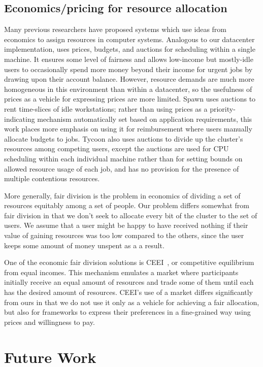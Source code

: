 \documentclass{acm_proc_article-sp}
\begin{document}
\subsection{Economics/pricing for resource allocation}
Many previous researchers have proposed systems which use ideas from economics
to assign resources in computer systems.  Analogous to our datacenter
implementation, \cite{stoica94} uses prices, budgets, and auctions for
scheduling within a single machine. It ensures some level of fairness and
allows low-income but mostly-idle users to occasionally spend more money beyond
their income for urgent jobs by drawing upon their account balance. However,
resource demands are much more homogeneous in this environment than within a
datacenter, so the usefulness of prices as a vehicle for expressing prices are
more limited. Spawn \cite{spawn} uses auctions to rent time-slices of idle
workstations; rather than using prices as a priority-indicating mechanism
automatically set based on application requirements, this work places more
emphasis on using it for reimbursement where users manually allocate budgets to
jobs. Tycoon \cite{tycoon} also uses auctions to divide up the cluster's
resources among competing users, except the auctions are used for CPU scheduling
within each individual machine rather than for setting bounds on allowed
resource usage of each job, and has no provision for the presence of
multiple contentious resources.

More generally, fair division is the problem in economics of dividing a set of
resources equitably among a set of people. Our problem differs somewhat from
fair division in that we don't seek to allocate every bit of the cluster to the
set of users. We assume that a user might be happy to have received nothing if
their value of gaining resources was too low compared to the others, since the
user keeps some amount of money unspent as a a result.

One of the economic fair division solutions is CEEI~\cite{moulin2004fair}, or
competitive equilibrium from equal incomes. This mechanism emulates a market
where participants initially receive an equal amount of resources and trade some
of them until each has the desired amount of resources. CEEI's use of a market
differs significantly from ours in that we do not use it only as a vehicle for
achieving a fair allocation, but also for frameworks to express their
preferences in a fine-grained way using prices and willingness to pay.

\section{Future Work}
\label{sec:future}
\end{document}
